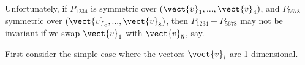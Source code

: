 Unfortunately, if $P_{1234}$ is symmetric over $(\vect{v}_1,...,\vect{v}_4)$, and $P_{5678}$ symmetric over $(\vect{v}_5,...,\vect{v}_8)$, then $P_{1234} + P_{5678}$ may not be invariant if we swap $\vect{v}_1$ with $\vect{v}_5$, say.

First consider the simple case where the vectors $\vect{v}_i$ are 1-dimensional.  


